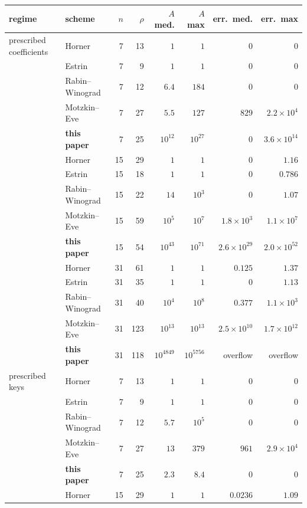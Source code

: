 \begin{table}[htbp]
\centering\footnotesize
\begin{tabular}{@{}llrrrrrr@{}}
\toprule
regime & scheme & $n$ & $\rho$ & $A$ med. & $A$ max & err.\ med. & err.\ max \\
\midrule
prescribed coefficients & Horner & 7 & 13 & $1$ & $1$ & $0$ & $0$ \\
 & Estrin & 7 & 9 & $1$ & $1$ & $0$ & $0$ \\
 & Rabin--Winograd & 7 & 12 & $6.4$ & $184$ & $0$ & $0$ \\
 & Motzkin--Eve & 7 & 27 & $5.5$ & $127$ & $829$ & $2.2\times10^{4}$ \\
 & \textbf{this paper} & 7 & 25 & $10^{12}$ & $10^{27}$ & $0$ & $3.6\times10^{14}$ \\
\addlinespace[2pt]
 & Horner & 15 & 29 & $1$ & $1$ & $0$ & $1.16$ \\
 & Estrin & 15 & 18 & $1$ & $1$ & $0$ & $0.786$ \\
 & Rabin--Winograd & 15 & 22 & $14$ & $10^{3}$ & $0$ & $1.07$ \\
 & Motzkin--Eve & 15 & 59 & $10^{5}$ & $10^{7}$ & $1.8\times10^{3}$ & $1.1\times10^{7}$ \\
 & \textbf{this paper} & 15 & 54 & $10^{43}$ & $10^{71}$ & $2.6\times10^{29}$ & $2.0\times10^{52}$ \\
\addlinespace[2pt]
 & Horner & 31 & 61 & $1$ & $1$ & $0.125$ & $1.37$ \\
 & Estrin & 31 & 35 & $1$ & $1$ & $0$ & $1.13$ \\
 & Rabin--Winograd & 31 & 40 & $10^{4}$ & $10^{8}$ & $0.377$ & $1.1\times10^{3}$ \\
 & Motzkin--Eve & 31 & 123 & $10^{13}$ & $10^{13}$ & $2.5\times10^{10}$ & $1.7\times10^{12}$ \\
 & \textbf{this paper} & 31 & 118 & $10^{4849}$ & $10^{5756}$ & overflow & overflow \\
\addlinespace[2pt]
\midrule
prescribed keys & Horner & 7 & 13 & $1$ & $1$ & $0$ & $0$ \\
 & Estrin & 7 & 9 & $1$ & $1$ & $0$ & $0$ \\
 & Rabin--Winograd & 7 & 12 & $5.7$ & $10^{5}$ & $0$ & $0$ \\
 & Motzkin--Eve & 7 & 27 & $13$ & $379$ & $961$ & $2.9\times10^{4}$ \\
 & \textbf{this paper} & 7 & 25 & $2.3$ & $8.4$ & $0$ & $0$ \\
\addlinespace[2pt]
 & Horner & 15 & 29 & $1$ & $1$ & $0.0236$ & $1.09$ \\

\end{tabular}
\end{table}
